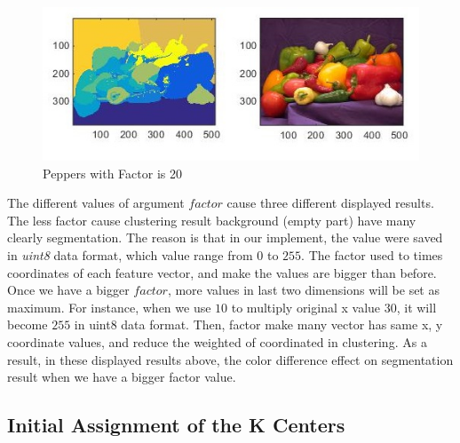 \documentclass[12pt]{article}
\begin{document}

\begin{figure}[h]
    \centering
    \includegraphics[width=1\textwidth]{peppersFactor20New.jpg}
    \caption{Peppers with Factor is 20}
    \label{fig:peppersFactor20}
\end{figure}


The different values of argument $factor$ cause three different displayed results. The less factor cause clustering result background (empty part) have many clearly segmentation. The reason is that in our implement, the value were saved in \textit{uint8} data format, which value range from $0$ to $255$. The factor used to times coordinates of each feature vector, and make the values are bigger than before. Once we have a bigger $factor$, more values in last two dimensions will be set as maximum. For instance, when we use $10$ to multiply original x value $30$, it will become $255$ in uint8 data format. Then, factor make many vector has same x, y coordinate values, and reduce the weighted of coordinated in clustering. As a result, in these displayed results above, the color difference effect on segmentation result when we have a bigger factor value.

\subsection{Initial Assignment of the K Centers}
\end{document}
